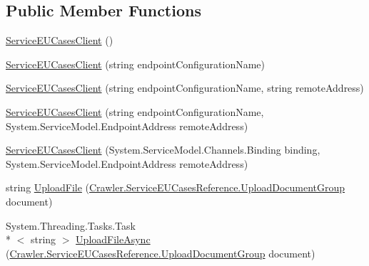 \subsection*{Public Member Functions}
\begin{DoxyCompactItemize}
\item 
\hyperlink{class_crawler_1_1_service_e_u_cases_reference_1_1_service_e_u_cases_client_a6a5098f965675318e7725be6271f2f1f}{Service\-E\-U\-Cases\-Client} ()
\item 
\hyperlink{class_crawler_1_1_service_e_u_cases_reference_1_1_service_e_u_cases_client_a35053146915df4149f0a283f84e8852e}{Service\-E\-U\-Cases\-Client} (string endpoint\-Configuration\-Name)
\item 
\hyperlink{class_crawler_1_1_service_e_u_cases_reference_1_1_service_e_u_cases_client_a67c5e08dbc0d2a206a0bc6ffb00bdadd}{Service\-E\-U\-Cases\-Client} (string endpoint\-Configuration\-Name, string remote\-Address)
\item 
\hyperlink{class_crawler_1_1_service_e_u_cases_reference_1_1_service_e_u_cases_client_a2e5b1620114d8887141b9d7425624d72}{Service\-E\-U\-Cases\-Client} (string endpoint\-Configuration\-Name, System.\-Service\-Model.\-Endpoint\-Address remote\-Address)
\item 
\hyperlink{class_crawler_1_1_service_e_u_cases_reference_1_1_service_e_u_cases_client_ad5fd26307de67cbfee52d449ebfa2d6f}{Service\-E\-U\-Cases\-Client} (System.\-Service\-Model.\-Channels.\-Binding binding, System.\-Service\-Model.\-Endpoint\-Address remote\-Address)
\item 
string \hyperlink{class_crawler_1_1_service_e_u_cases_reference_1_1_service_e_u_cases_client_a45f058b484c4d4c94fc9f5ecf471f0be}{Upload\-File} (\hyperlink{class_crawler_1_1_service_e_u_cases_reference_1_1_upload_document_group}{Crawler.\-Service\-E\-U\-Cases\-Reference.\-Upload\-Document\-Group} document)
\item 
System.\-Threading.\-Tasks.\-Task\\*
$<$ string $>$ \hyperlink{class_crawler_1_1_service_e_u_cases_reference_1_1_service_e_u_cases_client_ad9c02be4556618c516a9f4c87c11fc60}{Upload\-File\-Async} (\hyperlink{class_crawler_1_1_service_e_u_cases_reference_1_1_upload_document_group}{Crawler.\-Service\-E\-U\-Cases\-Reference.\-Upload\-Document\-Group} document)
\end{DoxyCompactItemize}


